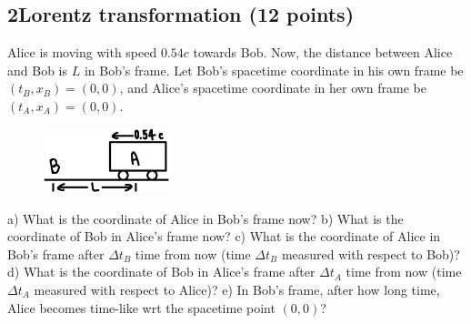 \documentclass[12pt]{book} %
\numberwithin{equation}{chapter}
\def\D{\Delta}
\def\lq{\hspace{2.5ex}}
\begin{document}
\subsection*{2\lq Lorentz transformation (12 points)}
Alice is moving with speed $0.54c$ towards Bob. Now, the distance between Alice and Bob is $L$ in Bob's frame. Let Bob's spacetime coordinate in his own frame be $(t_{B}, x_{B})=(0, 0)$, and Alice's spacetime coordinate in her own frame be $(t_{A}, x_{A})=(0, 0)$.
\begin{figure}[H]
\centering
\includegraphics[width=0.325\textwidth, left]{Lorentz transformation}
\end{figure}
\noindent a) What is the coordinate of Alice in Bob's frame now?\bigskip\newline
b) What is the coordinate of Bob in Alice's frame now?\bigskip\newline
c) What is the coordinate of Alice in Bob's frame after $\D t_{B}$ time from now (time $\D t_{B}$ measured with respect to Bob)?\bigskip\newline
d) What is the coordinate of Bob in Alice's frame after $\D t_{A}$ time from now (time $\D t_{A}$ measured with respect to Alice)?\bigskip\newline
e) In Bob's frame, after how long time, Alice becomes time-like wrt the spacetime point $(0, 0)$?
\end{document}
